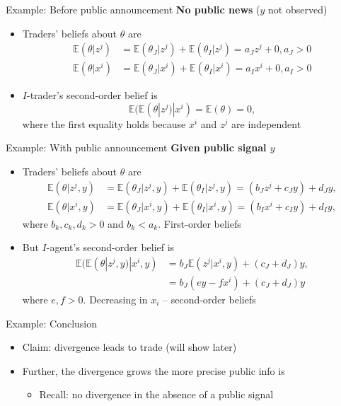\documentclass[english,10pt
,aspectratio=169
]{beamer}
\begin{document}
\begin{frame}{Example: Before public announcement}
	\textbf{No public news} ($y$ not observed)
	\begin{itemize}
		\item Traders' beliefs about $\theta$ are
		\begin{align*}
			\mathbb{E}(\theta|z^{j}) & =\mathbb{E}(\theta_{J}|z^{j})+\mathbb{E}(\theta_{I}|z^{j})=a_J z^{j}+0, a_J>0 \\
			\mathbb{E}(\theta|x^{i}) &=\mathbb{E}(\theta_{J}|x^{i})+\mathbb{E}(\theta_{I}|x^{i})=a_I x^{i}+0, a_I>0
		\end{align*}
		\item $I$-trader's second-order belief is
		\[
		\mathbb{E}(\mathbb{E}(\theta|z^{j})|x^{i})=\mathbb{E}(\theta) = 0,
		\]
		where the first equality holds because $x^{i}$ and $z^{j}$ are independent
	\end{itemize}
\end{frame}


\begin{frame}{Example: With public announcement}
	\textbf{Given public signal $y$}
	\begin{itemize}
		\item Traders' beliefs about $\theta$ are
		\begin{align*}
			\mathbb{E}(\theta|z^{j}, y) & =\mathbb{E}(\theta_{J}|z^{j},y)+\mathbb{E}(\theta_{I}|z^{j},y)=(b_J z^{j}+c_Jy)+d_J y,  \\
			\mathbb{E}(\theta|x^{i}, y) & =\mathbb{E}(\theta_{J}|x^{i},y)+\mathbb{E}(\theta_{I}|x^{i},y)=(b_I x^{i}+c_I y)+d_I y,
		\end{align*}
		where $b_k,c_k,d_k>0$ and $b_k<a_k$. First-order beliefs 
		\item But $I$-agent's second-order belief  is
		\begin{align*}
			\mathbb{E}(\mathbb{E}(\theta|z^{j},y)|x^{i},y)
			&=b_J\mathbb{E}(z^{j}|x^{i},y)+(c_J+d_J)y, \\
			&=b_J(ey-fx^{i})+(c_J+d_J)y 
		\end{align*}
		where $e,f>0$. 
		\alert{Decreasing in $x_i$} -- second-order beliefs 
	\end{itemize}
\end{frame}


\begin{frame}{Example: Conclusion}
	\begin{itemize}
		\item Claim: divergence leads to trade (will show later)
		\item Further, the divergence grows the more precise public info is
		\begin{itemize}
			\item Recall: no divergence in the absence of a public signal
		\end{itemize}
	\end{itemize}
\end{frame}
\end{document}
